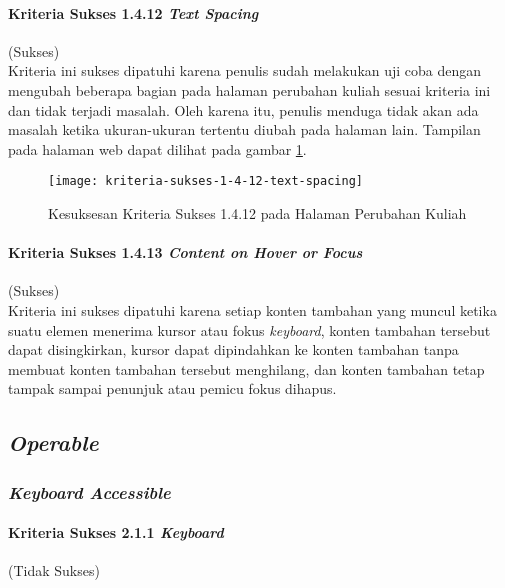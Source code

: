 \paragraph{Kriteria Sukses 1.4.12 \textit{Text Spacing}}
\label{par:kepatuhan_bluetape_kriteria_sukses_1.4.12}
(Sukses)\\

Kriteria ini sukses dipatuhi karena penulis sudah melakukan uji coba dengan mengubah beberapa bagian pada halaman perubahan kuliah sesuai kriteria ini dan tidak terjadi masalah. Oleh karena itu, penulis menduga tidak akan ada masalah ketika ukuran-ukuran tertentu diubah pada halaman lain. Tampilan pada halaman web dapat dilihat pada gambar \ref{fig:1.4.12_text_spacing}.

\begin{figure}[H]
    \centering  
    \texttt{[image: kriteria-sukses-1-4-12-text-spacing]}  
    \caption[Kesuksesan Kriteria Sukses 1.4.12 pada Halaman Perubahan Kuliah]{Kesuksesan Kriteria Sukses 1.4.12 pada Halaman Perubahan Kuliah}
    \label{fig:1.4.12_text_spacing}  
\end{figure} 

\paragraph{Kriteria Sukses 1.4.13 \textit{Content on Hover or Focus}}
\label{par:kepatuhan_bluetape_kriteria_sukses_1.4.13}
(Sukses)\\

Kriteria ini sukses dipatuhi karena setiap konten tambahan yang muncul ketika suatu elemen menerima kursor atau fokus \textit{keyboard}, konten tambahan tersebut dapat disingkirkan, kursor dapat dipindahkan ke konten tambahan tanpa membuat konten tambahan tersebut menghilang, dan konten tambahan tetap tampak sampai penunjuk atau pemicu fokus dihapus.

\subsection{\textit{Operable}}
\label{subsec:kepatuhan_bluetape_operable}

\subsubsection{\textit{Keyboard Accessible}}
\label{subsubsec:kepatuhan_bluetape_keyboard_accessible}

\paragraph{Kriteria Sukses 2.1.1 \textit{Keyboard}}
\label{par:kepatuhan_bluetape_kriteria_sukses_2.1.1}
(Tidak Sukses)\\

